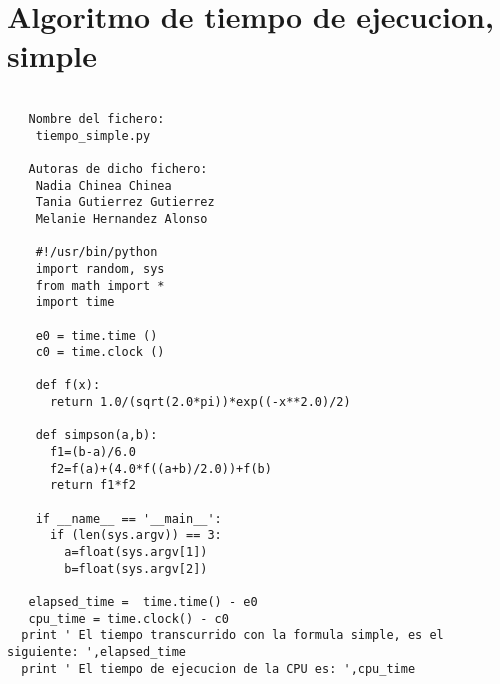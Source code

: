 \section{Algoritmo de tiempo de ejecucion, simple}
\label{sec3}
\begin{center}
\begin{footnotesize}
\begin{verbatim}
   
   Nombre del fichero:
    tiempo_simple.py

   Autoras de dicho fichero:
    Nadia Chinea Chinea 
    Tania Gutierrez Gutierrez 
    Melanie Hernandez Alonso

    #!/usr/bin/python
    import random, sys
    from math import *
    import time
  
    e0 = time.time ()
    c0 = time.clock ()
 
    def f(x):
      return 1.0/(sqrt(2.0*pi))*exp((-x**2.0)/2)
  
    def simpson(a,b):
      f1=(b-a)/6.0
      f2=f(a)+(4.0*f((a+b)/2.0))+f(b)
      return f1*f2 
  
    if __name__ == '__main__':
      if (len(sys.argv)) == 3:
        a=float(sys.argv[1])
        b=float(sys.argv[2])
 
   elapsed_time =  time.time() - e0
   cpu_time = time.clock() - c0
  print ' El tiempo transcurrido con la formula simple, es el siguiente: ',elapsed_time
  print ' El tiempo de ejecucion de la CPU es: ',cpu_time
 
\end{verbatim}
\end{footnotesize}
\end{center}

      
